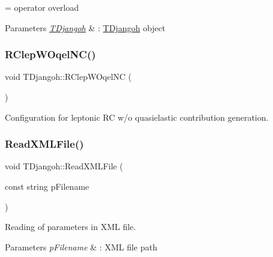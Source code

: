 = operator overload 


\begin{DoxyParams}{Parameters}
{\em \hyperlink{class_t_djangoh}{T\+Djangoh}} & \+: \hyperlink{class_t_djangoh}{T\+Djangoh} object \\
\hline
\end{DoxyParams}
\mbox{\label{class_t_djangoh_a283b09ffc625a6a14af2f301ae957c92}} 
\subsubsection{\texorpdfstring{R\+Clep\+W\+Oqel\+N\+C()}{RClepWOqelNC()}}
{\footnotesize\ttfamily void T\+Djangoh\+::\+R\+Clep\+W\+Oqel\+NC (\begin{DoxyParamCaption}{ }\end{DoxyParamCaption})}



Configuration for leptonic RC w/o quasielastic contribution generation. 

\mbox{\label{class_t_djangoh_af6954bed103bc5adc60822f16268c12d}} 
\subsubsection{\texorpdfstring{Read\+X\+M\+L\+File()}{ReadXMLFile()}}
{\footnotesize\ttfamily void T\+Djangoh\+::\+Read\+X\+M\+L\+File (\begin{DoxyParamCaption}\item[{const string}]{p\+Filename }\end{DoxyParamCaption})}



Reading of parameters in X\+ML file. 


\begin{DoxyParams}{Parameters}
{\em p\+Filename} & \+: X\+ML file path \\
\hline
\end{DoxyParams}
\mbox{\label{class_t_djangoh_a6995df5cd413a9e998fe8c0836004363}} 
